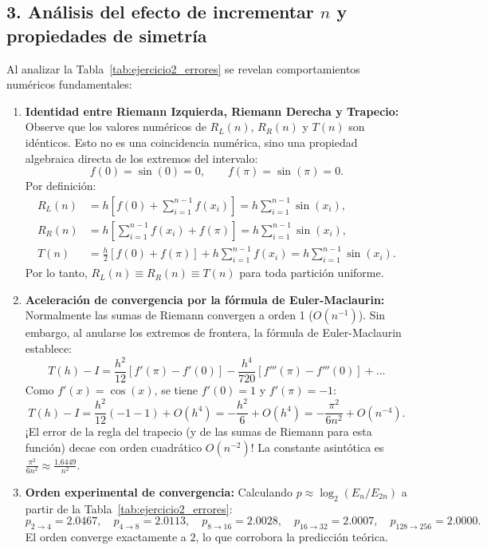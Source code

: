 \documentclass[11pt,a4paper]{article}
\begin{document}
\subsection{3. Análisis del efecto de incrementar $n$ y propiedades de simetría}
Al analizar la Tabla~\ref{tab:ejercicio2_errores} se revelan comportamientos numéricos fundamentales:

\begin{enumerate}
    \item \textbf{Identidad entre Riemann Izquierda, Riemann Derecha y Trapecio:}
    Observe que los valores numéricos de $R_L(n)$, $R_R(n)$ y $T(n)$ son idénticos. Esto no es una coincidencia numérica, sino una propiedad algebraica directa de los extremos del intervalo:
    \begin{equation}
        f(0) = \sin(0) = 0, \qquad f(\pi) = \sin(\pi) = 0.
    \end{equation}
    Por definición:
    \begin{align}
        R_L(n) &= h \left[ f(0) + \sum_{i=1}^{n-1} f(x_i) \right] = h \sum_{i=1}^{n-1} \sin(x_i), \\
        R_R(n) &= h \left[ \sum_{i=1}^{n-1} f(x_i) + f(\pi) \right] = h \sum_{i=1}^{n-1} \sin(x_i), \\
        T(n)   &= \frac{h}{2} [f(0) + f(\pi)] + h \sum_{i=1}^{n-1} f(x_i) = h \sum_{i=1}^{n-1} \sin(x_i).
    \end{align}
    Por lo tanto, $R_L(n) \equiv R_R(n) \equiv T(n)$ para toda partición uniforme.

    \item \textbf{Aceleración de convergencia por la fórmula de Euler-Maclaurin:}
    Normalmente las sumas de Riemann convergen a orden 1 ($O(n^{-1})$). Sin embargo, al anularse los extremos de frontera, la fórmula de Euler-Maclaurin establece:
    \begin{equation}
        T(h) - I = \frac{h^2}{12} \left[ f'(\pi) - f'(0) \right] - \frac{h^4}{720} \left[ f'''(\pi) - f'''(0) \right] + \dots
    \end{equation}
    Como $f'(x) = \cos(x)$, se tiene $f'(0) = 1$ y $f'(\pi) = -1$:
    \begin{equation}
        T(h) - I = \frac{h^2}{12} (-1 - 1) + O(h^4) = -\frac{h^2}{6} + O(h^4) = -\frac{\pi^2}{6 n^2} + O(n^{-4}).
    \end{equation}
    ¡El error de la regla del trapecio (y de las sumas de Riemann para esta función) decae con orden cuadrático $O(n^{-2})$! La constante asintótica es $\frac{\pi^2}{6 n^2} \approx \frac{1.6449}{n^2}$.
    
    \item \textbf{Orden experimental de convergencia:}
    Calculando $p \approx \log_2(E_n / E_{2n})$ a partir de la Tabla~\ref{tab:ejercicio2_errores}:
    \begin{equation}
        p_{2\to 4} = 2.0467, \quad p_{4\to 8} = 2.0113, \quad p_{8\to 16} = 2.0028, \quad p_{16\to 32} = 2.0007, \quad p_{128\to 256} = 2.0000.
    \end{equation}
    El orden converge exactamente a $2$, lo que corrobora la predicción teórica.
\end{enumerate}
\end{document}

